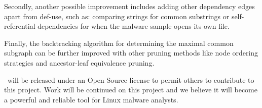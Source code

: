 Secondly, another possible improvement includes adding other dependency edges apart from def-use, such as: comparing strings for common substrings or self-referential dependencies for when the malware sample opens its own file.

Finally, the backtracking algorithm for determining the maximal common subgraph can be further improved with other pruning methods like node ordering strategies and ancestor-leaf equivalence pruning.

\textbf{\project}\ will be released under an Open Source license to permit others to contribute to this project. Work will be continued on this project and we believe it will become a powerful and reliable tool for Linux malware analysts.